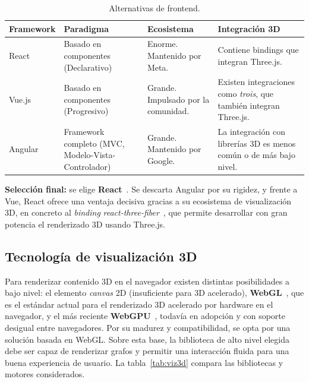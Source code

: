 \begin{table}[H]
	\centering
	\caption{Alternativas de frontend.}
	\label{tab:frontend}
	\small
	\begin{tabularx}{\textwidth}{>{\raggedright\arraybackslash}p{1.9cm} >{\raggedright\arraybackslash}p{3.1cm} >{\raggedright\arraybackslash}p{3.1cm} >{\raggedright\arraybackslash}X}
		\toprule
		\textbf{Framework} & \textbf{Paradigma} & \textbf{Ecosistema} & \textbf{Integración 3D} \\
		\midrule
		React & Basado en componentes (Declarativo) &
			Enorme. Mantenido por Meta. &
			Contiene bindings que integran Three.js. \\
		\addlinespace
		Vue.js & Basado en componentes (Progresivo) &
			Grande. Impulsado por la comunidad. &
			Existen integraciones como \textit{trois}, que también integran Three.js. \\
		\addlinespace
		Angular & Framework completo (MVC, Modelo-Vista-Controlador) &
			Grande. Mantenido por Google. &
			La integración con librerías 3D es menos común o de más bajo nivel. \\
		\bottomrule
	\end{tabularx}
\end{table}

\textbf{Selección final:} se elige \textbf{React}~\cite{react}. Se descarta Angular por su rigidez, y
frente a Vue, React ofrece una ventaja decisiva gracias a su ecosistema de visualización 3D, en
concreto al \textit{binding} \textit{react-three-fiber}~\cite{r3f}, que permite desarrollar con gran
potencia el renderizado 3D usando Three.js.

\subsection{Tecnología de visualización 3D}

Para renderizar contenido 3D en el navegador existen distintas posibilidades a bajo nivel: el
elemento \textit{canvas} 2D (insuficiente para 3D acelerado), \textbf{WebGL}~\cite{webgl}, que es el
estándar actual para el renderizado 3D acelerado por hardware en el navegador, y el más reciente
\textbf{WebGPU}~\cite{webgpu}, todavía en adopción y con soporte desigual entre navegadores. Por su
madurez y compatibilidad, se opta por una solución basada en WebGL. Sobre esta base, la biblioteca de
alto nivel elegida debe ser capaz de renderizar grafos y permitir una interacción fluida para una
buena experiencia de usuario. La tabla~\ref{tab:viz3d} compara las bibliotecas y motores considerados.

